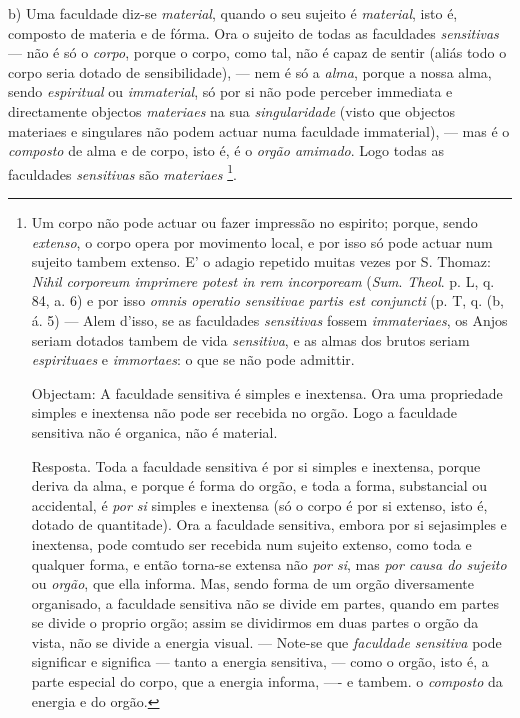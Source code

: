 b) Uma faculdade diz-se \emph{material}, quando o seu sujeito é \emph{material}, isto é, composto de materia e de fórma. Ora o sujeito de todas as faculdades \emph{sensitivas} --- não é só o \emph{corpo}, porque o corpo, como tal, não é capaz de sentir (aliás todo o corpo seria dotado de sensibilidade), --- nem é só a \emph{alma}, porque a nossa alma, sendo \emph{espiritual} ou \emph{immaterial}, só por si não pode perceber immediata e directamente objectos \emph{materiaes} na sua \emph{singularidade} (visto que objectos materiaes e singulares não podem actuar numa faculdade immaterial), --- mas é o \emph{composto} de alma e de corpo, isto é, é o \emph{orgão amimado}. Logo todas as faculdades \emph{sensitivas} são \emph{materiaes} \footnote{Um corpo não pode actuar ou fazer impressão no espirito; porque, sendo \emph{extenso}, o corpo opera por movimento local, e por isso só pode actuar num sujeito tambem extenso. E' o adagio repetido muitas vezes por S. Thomaz: \emph{Nihil corporeum imprimere potest in rem incorpoream} (\emph{Sum}. \emph{Theol}. p. L, q. 84, a. 6) e por isso \emph{omnis operatio sensitivae partis est conjuncti} (p. T, q. (b, á. 5) --- Alem d'isso, se as faculdades \emph{sensitivas} fossem \emph{immateriaes}, os Anjos seriam dotados tambem de vida \emph{sensitiva}, e as almas dos brutos seriam \emph{espirituaes} e \emph{immortaes}: o que se não pode admittir.\par Objectam: A faculdade sensitiva é simples e inextensa. Ora uma propriedade simples e inextensa não pode ser recebida no orgão. Logo a faculdade sensitiva não é organica, não é material.\par Resposta. Toda a faculdade sensitiva é por si simples e inextensa, porque deriva da alma, e porque é forma do orgão, e toda a forma, substancial ou accidental, é \emph{por si} simples e inextensa (só o corpo é por si extenso, isto é, dotado de quantitade). Ora a faculdade sensitiva, embora por si sejasimples e inextensa, pode comtudo ser recebida num sujeito extenso, como toda e qualquer forma, e então torna-se extensa não \emph{por si}, mas \emph{por causa do sujeito} ou \emph{orgão}, que ella informa. Mas, sendo forma de um orgão diversamente organisado, a faculdade sensitiva não se divide em partes, quando em partes se divide o proprio orgão; assim se dividirmos em duas partes o orgão da vista, não se divide a energia visual. --- Note-se que \emph{faculdade sensitiva} pode significar e significa --- tanto a energia sensitiva, --- como o orgão, isto é, a parte especial do corpo, que a energia informa, ---- e tambem. o \emph{composto} da energia e do orgão.}.

